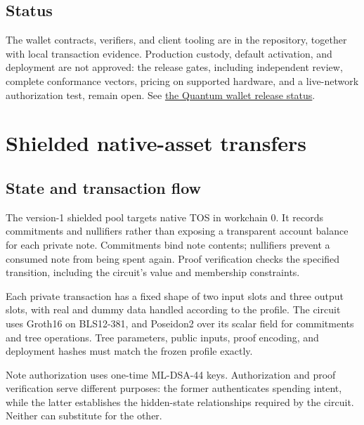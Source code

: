 \documentclass[11pt,a4paper]{article}
\newcommand{\repo}[2]{\href{https://github.com/tosnetwork/tos/blob/main/#1}{#2}}
\begin{document}
\subsection{Status}
The wallet contracts, verifiers, and client tooling are in the repository,
together with local transaction evidence. Production custody, default
activation, and deployment are not approved: the release gates, including
independent review, complete conformance vectors, pricing on supported
hardware, and a live-network authorization test, remain open. See
\repo{doc/wallet-quantum-release-status.md}{the Quantum wallet release status}.

\section{Shielded native-asset transfers}
\subsection{State and transaction flow}
The version-1 shielded pool targets native TOS in workchain 0. It records
commitments and nullifiers rather than exposing a transparent account balance
for each private note. Commitments bind note contents; nullifiers prevent a
consumed note from being spent again. Proof verification checks the specified
transition, including the circuit's value and membership constraints.

\begin{center}
\end{center}
Each private transaction has a fixed shape of two input slots and three
output slots, with real and dummy data handled according to the profile.
The circuit uses Groth16 on BLS12-381, and Poseidon2 over its scalar field
for commitments and tree operations. Tree parameters, public inputs, proof
encoding, and deployment hashes must match the frozen profile exactly.

Note authorization uses one-time ML-DSA-44 keys. Authorization and proof
verification serve different purposes: the former authenticates spending
intent, while the latter establishes the hidden-state relationships required
by the circuit. Neither can substitute for the other.
\end{document}
